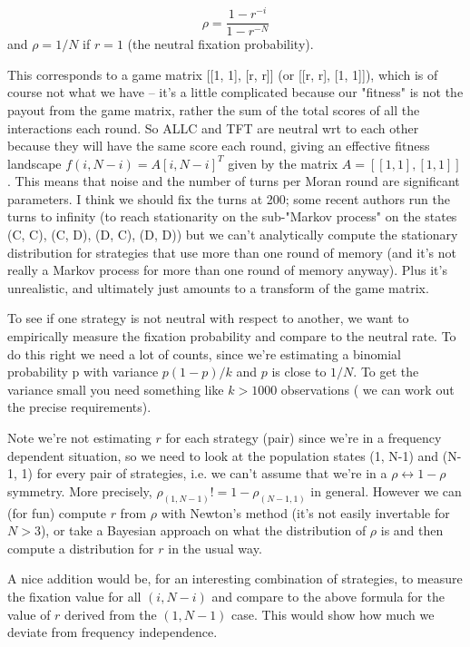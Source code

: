 \documentclass{article}
\begin{document}
{\[ \rho = \frac{1 - r^{-i}}{1 - r^{-N}}\]
and $\rho = 1 / N$ if $r=1$ (the neutral fixation probability).

This corresponds to a game matrix [[1, 1], [r, r]] (or [[r, r], [1, 1]]), which
is of course not what we have -- it's a little complicated because our "fitness"
is not the payout from the game matrix, rather the sum of the total scores of
all the interactions each round. So ALLC and TFT are neutral wrt to each other
because they will have the same score each round, giving an effective fitness
landscape $f(i, N-i) = A [i, N-i]^T$ given by the matrix $A = [[1,1],[1,1]]$.
This means that noise and the number of turns per Moran round are significant
parameters. I think we should fix the turns at 200; some recent authors run the
turns to infinity (to reach stationarity on the sub-"Markov process" on the
states (C, C), (C, D), (D, C), (D, D)) but we can't analytically compute the
stationary distribution for strategies that use more than one round of memory
(and it's not really a Markov process for more than one round of memory anyway).
Plus it's unrealistic, and ultimately just amounts to a transform of the game
matrix.

To see if one strategy is not neutral with respect to another, we want to
empirically measure the fixation probability and compare to the neutral rate. To
do this right we need a lot of counts, since we're estimating a binomial
probability p with variance $p(1-p) / k$ and $p$ is close to $1 / N$. To get the
variance small you need something like $k>1000$ observations ( we can work out
the precise requirements).

Note we're not estimating $r$ for each strategy (pair) since we're in a
frequency dependent situation, so we need to look at the population states (1,
N-1) and (N-1, 1) for every pair of strategies, i.e. we can't assume that we're
in a $\rho \leftrightarrow 1-\rho$ symmetry. More precisely, $\rho_{(1, N-1)} !=
1 - \rho_{(N-1, 1)}$ in general. However we can (for fun) compute $r$ from
$\rho$ with Newton's method (it's not easily invertable for $N > 3$), or take a
Bayesian approach on what the distribution of $\rho$ is and then compute a
distribution for $r$ in the usual way.

A nice addition would be, for an interesting combination of strategies, to
measure the fixation value for all $(i, N-i)$ and compare to the above formula
for the value of $r$ derived from the $(1, N-1)$ case. This would show how much
we deviate from frequency independence.


}
\end{document}
